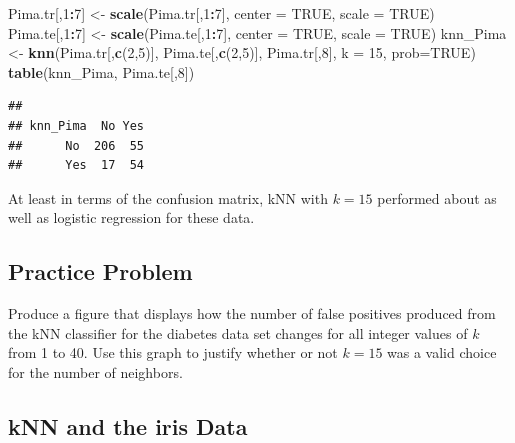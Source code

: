 \documentclass[
]{krantz}
\newenvironment{Shaded}{\begin{snugshade}}{\end{snugshade}}
\newcommand{\DataTypeTok}[1]{\textcolor[rgb]{0.13,0.29,0.53}{#1}}
\newcommand{\DecValTok}[1]{\textcolor[rgb]{0.00,0.00,0.81}{#1}}
\newcommand{\KeywordTok}[1]{\textcolor[rgb]{0.13,0.29,0.53}{\textbf{#1}}}
\newcommand{\NormalTok}[1]{#1}
\newcommand{\OperatorTok}[1]{\textcolor[rgb]{0.81,0.36,0.00}{\textbf{#1}}}
\newcommand{\OtherTok}[1]{\textcolor[rgb]{0.56,0.35,0.01}{#1}}
\newcommand{\StringTok}[1]{\textcolor[rgb]{0.31,0.60,0.02}{#1}}
\begin{document}
\begin{Shaded}
\begin{Highlighting}[]
\NormalTok{Pima.tr[,}\DecValTok{1}\OperatorTok{:}\DecValTok{7}\NormalTok{] \textless{}{-}}\StringTok{ }\KeywordTok{scale}\NormalTok{(Pima.tr[,}\DecValTok{1}\OperatorTok{:}\DecValTok{7}\NormalTok{], }\DataTypeTok{center =} \OtherTok{TRUE}\NormalTok{, }\DataTypeTok{scale =} \OtherTok{TRUE}\NormalTok{)}
\NormalTok{Pima.te[,}\DecValTok{1}\OperatorTok{:}\DecValTok{7}\NormalTok{] \textless{}{-}}\StringTok{ }\KeywordTok{scale}\NormalTok{(Pima.te[,}\DecValTok{1}\OperatorTok{:}\DecValTok{7}\NormalTok{], }\DataTypeTok{center =} \OtherTok{TRUE}\NormalTok{, }\DataTypeTok{scale =} \OtherTok{TRUE}\NormalTok{)}
\NormalTok{knn\_Pima \textless{}{-}}\StringTok{ }\KeywordTok{knn}\NormalTok{(Pima.tr[,}\KeywordTok{c}\NormalTok{(}\DecValTok{2}\NormalTok{,}\DecValTok{5}\NormalTok{)], Pima.te[,}\KeywordTok{c}\NormalTok{(}\DecValTok{2}\NormalTok{,}\DecValTok{5}\NormalTok{)], Pima.tr[,}\DecValTok{8}\NormalTok{], }
        \DataTypeTok{k =} \DecValTok{15}\NormalTok{, }\DataTypeTok{prob=}\OtherTok{TRUE}\NormalTok{)}
\KeywordTok{table}\NormalTok{(knn\_Pima, Pima.te[,}\DecValTok{8}\NormalTok{])}
\end{Highlighting}
\end{Shaded}

\begin{verbatim}
##         
## knn_Pima  No Yes
##      No  206  55
##      Yes  17  54
\end{verbatim}

At least in terms of the confusion matrix, kNN with \(k=15\) performed about as well as logistic regression for these data.

\hypertarget{classPP1}{%
\subsection{Practice Problem}\label{classPP1}}

Produce a figure that displays how the number of false positives produced from the kNN classifier for the diabetes data set changes for all integer values of \(k\) from 1 to 40. Use this graph to justify whether or not \(k = 15\) was a valid choice for the number of neighbors.

\hypertarget{knn-and-the-iris-data}{%
\subsection{kNN and the iris Data}\label{knn-and-the-iris-data}}
\end{document}
